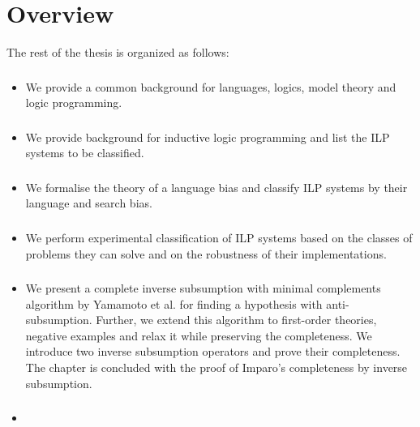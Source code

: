 \section{Overview}
The rest of the thesis is organized as follows:
\begin{itemize}
\item \subsubsection{} We provide a common background for languages, logics, model theory and logic programming.
\item \subsubsection{}
We provide background for inductive logic programming and list the ILP systems to be classified.
\item \subsubsection{}
We formalise the theory of a language bias and classify ILP systems by their language and search bias.
\item \subsubsection{}
We perform experimental classification of ILP systems based on the classes of problems they can solve and on the robustness of their implementations.
\item \subsubsection{}
We present a complete inverse subsumption with minimal complements algorithm by Yamamoto et al. \cite{yamamoto2012inverse} for finding a hypothesis with anti-subsumption. Further, we extend this algorithm to first-order theories, negative examples and relax it while preserving the completeness. We introduce two inverse subsumption operators and prove their completeness. The chapter is concluded with the proof of Imparo's completeness by inverse subsumption.
\item \subsubsection{}

\end{itemize}

